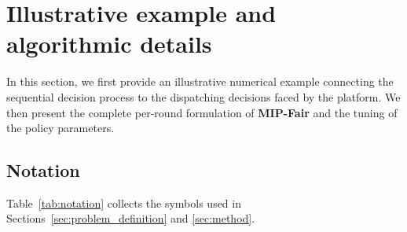\documentclass[a4paper,11pt,review,3p,authoryear]{elsarticle}
\begin{document}
\section{Illustrative example and algorithmic details}
\label{sec:App_alg_section}

In this section, we first provide an illustrative numerical example connecting the sequential decision process to the dispatching decisions faced by the platform. We then present the complete per-round formulation of \textbf{MIP-Fair} and the tuning of the policy parameters.

\subsection{Notation}
\label{sec:App_notation}

Table~\ref{tab:notation} collects the symbols used in Sections~\ref{sec:problem_definition} and \ref{sec:method}.
\end{document}
